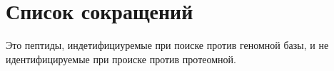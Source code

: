 \section{Список сокращений}
\noindent
{} Это пептиды, индетифициуремые при поиске против геномной базы, и не идентифицируемые при происке против протеомной.


\newpage
